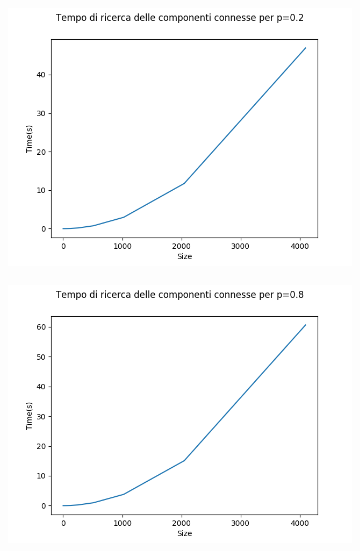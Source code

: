 \documentclass[]{article}
\begin{document}
\begin{figure}[H]
    \centering
    \begin{subfigure}[b]{0.45\linewidth} 
        \centering
        \includegraphics[width=\textwidth]{cc_time_p=02}
        \label{fig:ccs_time_p=02}
    \end{subfigure}
    \quad
    \begin{subfigure}[b]{0.45\linewidth}
        \centering
        \includegraphics[width=\textwidth]{cc_time_p=08}
        \label{fig:ccs_time_p=08}
    \end{subfigure}
\end{figure}
\newpage
\end{document}

